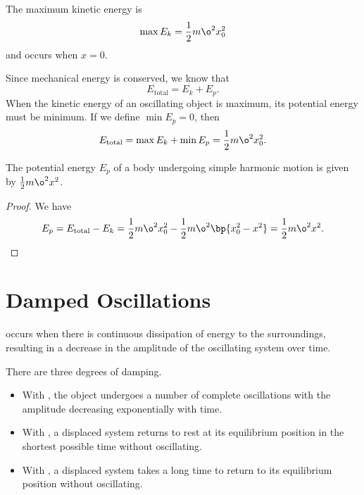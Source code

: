 \begin{corollary}
    The maximum kinetic energy is \[\max E_k = \frac12 m \o^2 x_0^2\] and occurs when $x = 0$.
\end{corollary}

Since mechanical energy is conserved, we know that \[E_{\text{total}} = E_k + E_p.\] When the kinetic energy of an oscillating object is maximum, its potential energy must be minimum. If we define $\min E_p = 0$, then \[E_{\text{total}} = \max E_k + \min E_p = \frac12 m \o^2 x_0^2.\]

\begin{proposition}
    The potential energy $E_p$ of a body undergoing simple harmonic motion is given by $\frac12 m \o^2 x^2$.
\end{proposition}
\begin{proof}
    We have \[E_p = E_{\text{total}} - E_k = \frac12 m \o^2 x_0^2 - \frac12 m \o^2 \bp{x_0^2 - x^2} = \frac12 m \o^2 x^2.\]
\end{proof}

\section{Damped Oscillations}

\begin{definition}
     occurs when there is continuous dissipation of energy to the surroundings, resulting in a decrease in the amplitude of the oscillating system over time.
\end{definition}

There are three degrees of damping.
\begin{itemize}
    \item With , the object undergoes a number of complete oscillations with the amplitude decreasing exponentially with time.
    \item With , a displaced system returns to rest at its equilibrium position in the shortest possible time without oscillating.
    \item With , a displaced system takes a long time to return to its equilibrium position without oscillating.
\end{itemize}

